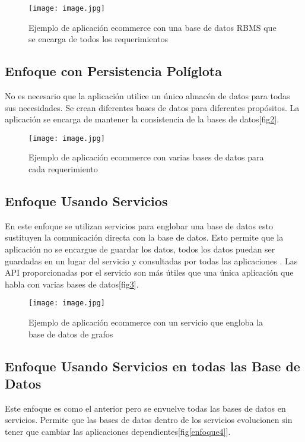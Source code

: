 \documentclass[conference,compsoc]{IEEEtran}
\begin{document}
\begin{figure}[!h]
\centering
\texttt{[image: image.jpg]}
\caption{Ejemplo de aplicación ecommerce con una base de datos RBMS que se encarga de todos los requerimientos \cite{art15} }
\label{enfoque1}
\end{figure}

\subsection{Enfoque con Persistencia Políglota}
No es necesario que la aplicación utilice un único almacén de datos para todas sus necesidades. Se crean diferentes bases de datos para diferentes propósitos. La aplicación se encarga de mantener la consistencia de la bases de datos[fig\ref{enfoque2}].

\begin{figure}[!h]
\centering
\texttt{[image: image.jpg]}
\caption{Ejemplo de aplicación ecommerce con varias bases de datos para cada requerimiento \cite{art15}}
\label{enfoque2}
\end{figure}

\subsection{Enfoque Usando Servicios }
En este enfoque se utilizan servicios para  englobar una base de datos esto sustituyen la comunicación directa con la base de datos. Esto permite que la aplicación no se encargue de guardar los datos,  todos los datos puedan ser guardadas en un lugar del servicio y consultadas por todas las aplicaciones . Las API proporcionadas por el servicio son más útiles que una única aplicación que habla con varias bases de datos[fig\ref{enfoque3}].

\begin{figure}[!h]
\centering
\texttt{[image: image.jpg]}
\caption{Ejemplo de aplicación ecommerce con un servicio que engloba la base de datos de grafos \cite{art15} }
\label{enfoque3}
\end{figure}


\subsection{Enfoque Usando Servicios en todas las Base de Datos}
Este enfoque es como el anterior pero se envuelve todas las bases de datos en  servicios. Permite que las bases de datos dentro de los servicios evolucionen sin tener que cambiar las aplicaciones dependientes[fig\ref{enfoque4}].
\end{document}
